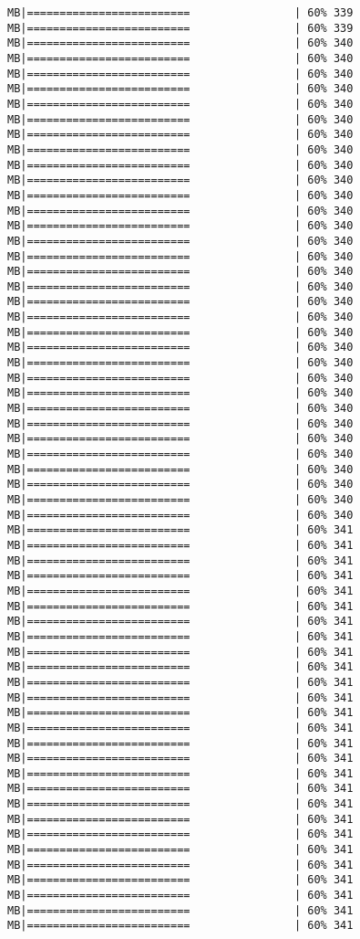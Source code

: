 \documentclass[
]{article}
\begin{document}
\begin{verbatim}
MB|=========================                | 60% 339 MB|=========================                | 60% 339 MB|=========================                | 60% 340 MB|=========================                | 60% 340 MB|=========================                | 60% 340 MB|=========================                | 60% 340 MB|=========================                | 60% 340 MB|=========================                | 60% 340 MB|=========================                | 60% 340 MB|=========================                | 60% 340 MB|=========================                | 60% 340 MB|=========================                | 60% 340 MB|=========================                | 60% 340 MB|=========================                | 60% 340 MB|=========================                | 60% 340 MB|=========================                | 60% 340 MB|=========================                | 60% 340 MB|=========================                | 60% 340 MB|=========================                | 60% 340 MB|=========================                | 60% 340 MB|=========================                | 60% 340 MB|=========================                | 60% 340 MB|=========================                | 60% 340 MB|=========================                | 60% 340 MB|=========================                | 60% 340 MB|=========================                | 60% 340 MB|=========================                | 60% 340 MB|=========================                | 60% 340 MB|=========================                | 60% 340 MB|=========================                | 60% 340 MB|=========================                | 60% 340 MB|=========================                | 60% 340 MB|=========================                | 60% 340 MB|=========================                | 60% 340 MB|=========================                | 60% 341 MB|=========================                | 60% 341 MB|=========================                | 60% 341 MB|=========================                | 60% 341 MB|=========================                | 60% 341 MB|=========================                | 60% 341 MB|=========================                | 60% 341 MB|=========================                | 60% 341 MB|=========================                | 60% 341 MB|=========================                | 60% 341 MB|=========================                | 60% 341 MB|=========================                | 60% 341 MB|=========================                | 60% 341 MB|=========================                | 60% 341 MB|=========================                | 60% 341 MB|=========================                | 60% 341 MB|=========================                | 60% 341 MB|=========================                | 60% 341 MB|=========================                | 60% 341 MB|=========================                | 60% 341 MB|=========================                | 60% 341 MB|=========================                | 60% 341 MB|=========================                | 60% 341 MB|=========================                | 60% 341 MB|=========================                | 60% 341 MB|=========================                | 60% 341 MB|=========================                | 60% 341 
\end{verbatim}
\end{document}
